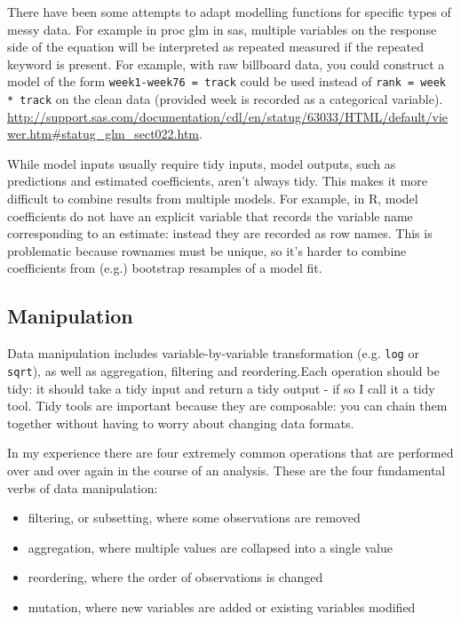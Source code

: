 \documentclass[oneside]{article}
\begin{document}
There have been some attempts to adapt modelling functions for specific types of messy data. For example in {\sc proc glm} in {\sc sas}, multiple variables on the response side of the equation will be interpreted as repeated measured if the {\sc repeated} keyword is present.  For example, with raw billboard data, you could construct a model of the form \verb|week1-week76 = track| could be used instead of \verb|rank = week * track| on the clean data (provided week is recorded as a categorical variable). \url{http://support.sas.com/documentation/cdl/en/statug/63033/HTML/default/viewer.htm#statug_glm_sect022.htm}.

While model inputs usually require tidy inputs, model outputs, such as predictions and estimated coefficients, aren't always tidy. This makes it more difficult to combine results from multiple models. For example, in R, model coefficients do not have an explicit variable that records the variable name corresponding to an estimate: instead they are recorded as row names.  This is problematic because rownames must be unique, so it's harder to combine coefficients from (e.g.) bootstrap resamples of a model fit.

\subsection{Manipulation}

Data manipulation includes variable-by-variable transformation (e.g. {\tt log} or {\tt sqrt}), as well as aggregation, filtering and reordering.Each operation should be tidy: it should take a tidy input and return a tidy output - if so I call it a tidy tool. Tidy tools are important because they are composable: you can chain them together without having to worry about changing data formats.

In my experience there are four extremely common operations that are performed over and over again in the course of an analysis. These are the four fundamental verbs of data manipulation:

\begin{itemize}

\item filtering, or subsetting, where some observations are removed
\item aggregation, where multiple values are collapsed into a single value
\item reordering, where the order of observations is changed
\item mutation, where new variables are added or existing variables modified 

\end{itemize}
\end{document}
